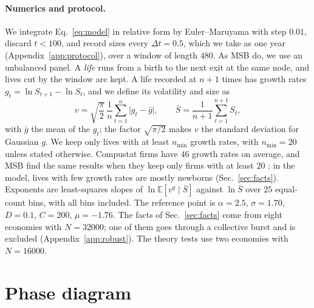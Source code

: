 \documentclass[pre,twocolumn,superscriptaddress,nofootinbib]{revtex4-2}
\newcommand{\E}{\mathbb E}
\newcommand{\Sb}{\bar S}
\begin{document}
\paragraph{Numerics and protocol.}  We integrate Eq.~\eqref{eq:model} in relative form by
Euler--Maruyama with step $0.01$, discard $t<100$, and record sizes every $\Delta t=0.5$, which we take
as one year (Appendix~\ref{app:protocol}), over a window of length $480$.  As MSB do, we use an
unbalanced panel.  A \emph{life} runs from a birth to the next exit at the same node, and lives cut by
the window are kept.  A life recorded at $n+1$ times has growth rates $g_t=\ln S_{t+1}-\ln S_t$, and we define its
volatility and size as
\begin{equation}
v=\sqrt{\frac{\pi}{2}}\,\frac1n\sum_{t=1}^{n}\big|g_t-\bar g\big|,\qquad
\Sb=\frac1{n+1}\sum_{t=1}^{n+1}S_t,
\label{eq:vol}
\end{equation}
with $\bar g$ the mean of the $g_t$; the factor $\sqrt{\pi/2}$ makes $v$ the standard deviation for
Gaussian $g$.  We keep
only lives with at least $n_{\min}$ growth rates, with $n_{\min}=20$ unless stated otherwise.  Compustat
firms have $46$ growth rates on average, and MSB find the same results when they keep only firms with at
least $20$ \cite{moran2024}; in the model, lives with few growth rates are mostly newborns
(Sec.~\ref{sec:facts}).  Exponents are least-squares slopes of $\ln\E[v^q\mid\Sb]$ against $\ln\Sb$ over
$25$ equal-count bins, with all bins included.  The reference point is $\alpha=2.5$, $\sigma=1.70$,
$D=0.1$, $C=200$, $\mu=-1.76$.  The facts of Sec.~\ref{sec:facts} come from eight economies with
$N=32000$; one of them goes through a collective burst and is excluded (Appendix~\ref{app:robust}).  The
theory tests use two economies with $N=16000$.

\section{Phase diagram}
\label{sec:phase}
\end{document}
